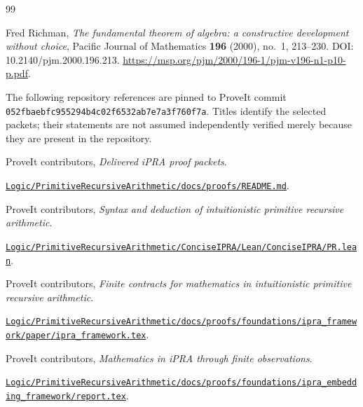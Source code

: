 \begin{thebibliography}{99}

\small

 Fred Richman, \emph{The fundamental theorem of algebra: a constructive development without choice}, Pacific Journal of Mathematics \textbf{196} (2000), no.~1, 213--230. DOI: 10.2140/pjm.2000.196.213. \url{https://msp.org/pjm/2000/196-1/pjm-v196-n1-p10-p.pdf}.

\medskip\noindent The following repository references are pinned to ProveIt commit \texttt{052fbaebfc955294b4c02f6532ab7e7a3f760f7a}. Titles identify the selected packets; their statements are not assumed independently verified merely because they are present in the repository.

 ProveIt contributors, \emph{Delivered iPRA proof packets}.\par\nopagebreak\href{https://github.com/VladimirReshetnikov/ProveIt/blob/052fbaebfc955294b4c02f6532ab7e7a3f760f7a/Logic/PrimitiveRecursiveArithmetic/docs/proofs/README.md}{\nolinkurl{Logic/PrimitiveRecursiveArithmetic/docs/proofs/README.md}}.

 ProveIt contributors, \emph{Syntax and deduction of intuitionistic primitive recursive arithmetic}.\par\nopagebreak\href{https://github.com/VladimirReshetnikov/ProveIt/blob/052fbaebfc955294b4c02f6532ab7e7a3f760f7a/Logic/PrimitiveRecursiveArithmetic/ConciseIPRA/Lean/ConciseIPRA/PR.lean}{\nolinkurl{Logic/PrimitiveRecursiveArithmetic/ConciseIPRA/Lean/ConciseIPRA/PR.lean}}.

 ProveIt contributors, \emph{Finite contracts for mathematics in intuitionistic primitive recursive arithmetic}.\par\nopagebreak\href{https://github.com/VladimirReshetnikov/ProveIt/blob/052fbaebfc955294b4c02f6532ab7e7a3f760f7a/Logic/PrimitiveRecursiveArithmetic/docs/proofs/foundations/ipra_framework/paper/ipra_framework.tex}{\nolinkurl{Logic/PrimitiveRecursiveArithmetic/docs/proofs/foundations/ipra_framework/paper/ipra_framework.tex}}.

 ProveIt contributors, \emph{Mathematics in iPRA through finite observations}.\par\nopagebreak\href{https://github.com/VladimirReshetnikov/ProveIt/blob/052fbaebfc955294b4c02f6532ab7e7a3f760f7a/Logic/PrimitiveRecursiveArithmetic/docs/proofs/foundations/ipra_embedding_framework/report.tex}{\nolinkurl{Logic/PrimitiveRecursiveArithmetic/docs/proofs/foundations/ipra_embedding_framework/report.tex}}.


\end{thebibliography}
